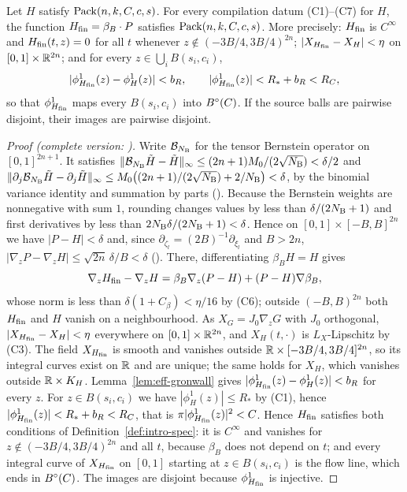 \begin{theorem}\label{thm:eff-finite}
Let $H$ satisfy $\mathrm{Pack}(n,k,C,c,s)$. For every compilation datum (C1)--(C7) for $H$, the function
$H_{\mathrm{fin}}=\beta_B\cdot P$ satisfies $\mathrm{Pack}(n,k,C,c,s)$. More precisely: $H_{\mathrm{fin}}$ is $C^\infty$ and $H_{\mathrm{fin}}(t,z)=0$ for
all $t$ whenever $z\notin(-3B/4,3B/4)^{2n}$; $|X_{H_{\mathrm{fin}}}-X_H|<\eta$ on $[0,1]\times\mathbb{R}^{2n}$; and for every
$z\in\bigcup_iB(s_i,c_i)$,
\[
 |\phi^1_{H_{\mathrm{fin}}}(z)-\phi^1_H(z)|<b_R,\qquad |\phi^1_{H_{\mathrm{fin}}}(z)|<R_*+b_R<R_C,
\]
so that $\phi^1_{H_{\mathrm{fin}}}$ maps every $B(s_i,c_i)$ into $B^{\circ}(C)$. If the source balls are pairwise disjoint,
their images are pairwise disjoint.
\end{theorem}

\begin{proof}[Proof (complete version: )]
Write $\mathcal B_{N_{\rm B}}$ for the tensor Bernstein operator on $[0,1]^{2n+1}$. It satisfies
$\|\mathcal B_{N_{\rm B}}\tilde H-\tilde H\|_\infty\le(2n+1)M_0/(2\sqrt{N_{\rm B}})<\delta/2$ and
$\|\partial_j\mathcal B_{N_{\rm B}}\tilde H-\partial_j\tilde H\|_\infty\le
M_0\bigl((2n+1)/(2\sqrt{N_{\rm B}})+2/N_{\rm B}\bigr)<\delta$, by the binomial variance identity and summation by
parts (). Because the Bernstein weights are nonnegative with sum $1$,
rounding changes values by less than $\delta/(2N_{\rm B}+1)$ and first derivatives by less than
$2N_{\rm B}\delta/(2N_{\rm B}+1)<\delta$. Hence on $[0,1]\times[-B,B]^{2n}$ we have $|P-H|<\delta$ and, since
$\partial_{\zeta_l}=(2B)^{-1}\partial_{\xi_l}$ and $B>2n$, $|\nabla_zP-\nabla_zH|\le\sqrt{2n}\,\delta/B<\delta$
(). There, differentiating $\beta_BH=H$ gives
\[
 \nabla_zH_{\mathrm{fin}}-\nabla_zH=\beta_B\nabla_z(P-H)+(P-H)\nabla\beta_B ,
\]
whose norm is less than $\delta(1+C_\beta)<\eta/16$ by (C6); outside $(-B,B)^{2n}$ both $H_{\mathrm{fin}}$ and $H$ vanish on a
neighbourhood. As $X_G=J_0\nabla_zG$ with $J_0$ orthogonal, $|X_{H_{\mathrm{fin}}}-X_H|<\eta$ everywhere on
$[0,1]\times\mathbb{R}^{2n}$, and $X_H(t,\cdot)$ is $L_X$-Lipschitz by (C3). The field $X_{H_{\mathrm{fin}}}$ is smooth and
vanishes outside $\mathbb{R}\times[-3B/4,3B/4]^{2n}$, so its integral curves exist on $\mathbb{R}$ and are unique; the same
holds for $X_H$, which vanishes outside $\mathbb{R}\times K_H$. Lemma~\ref{lem:eff-gronwall} gives
$|\phi^1_{H_{\mathrm{fin}}}(z)-\phi^1_H(z)|<b_R$ for every $z$. For $z\in B(s_i,c_i)$ we have $|\phi^1_H(z)|\le R_*$ by
(C1), hence $|\phi^1_{H_{\mathrm{fin}}}(z)|<R_*+b_R<R_C$, that is $\pi|\phi^1_{H_{\mathrm{fin}}}(z)|^2<C$. Hence $H_{\mathrm{fin}}$ satisfies both
conditions of Definition~\ref{def:intro-spec}: it is $C^\infty$ and vanishes for $z\notin(-3B/4,3B/4)^{2n}$ and
all $t$, because $\beta_B$ does not depend on $t$; and every integral curve of $X_{H_{\mathrm{fin}}}$ on $[0,1]$ starting at
$z\in B(s_i,c_i)$ is the flow line, which ends in $B^{\circ}(C)$. The images are disjoint because $\phi^1_{H_{\mathrm{fin}}}$ is
injective.
\end{proof}

